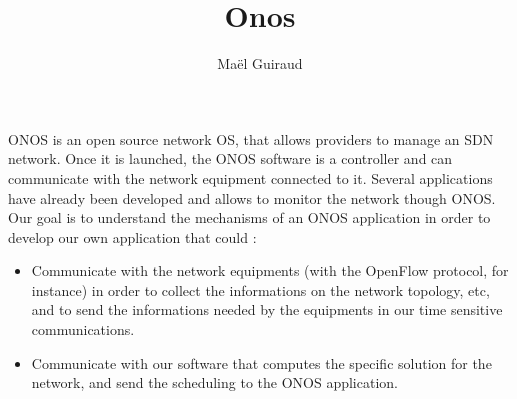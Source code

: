 \documentclass[10pt]{article}
\title{Onos}
\author[1,2]{Ma\"el Guiraud}
\affil[1]{David Laboratory, UVSQ}
\affil[2]{Nokia Bell Labs France}
\begin{document}
\maketitle

ONOS is an open source network OS, that allows providers to manage an SDN network. Once it is launched, the ONOS software is a controller and can communicate with the network equipment connected to it. Several applications have already been developed and allows to monitor the network though ONOS. Our goal is to understand the mechanisms of an ONOS application in order to develop our own application that could :
\begin{itemize}
\item Communicate with the network equipments (with the OpenFlow protocol, for instance) in order to collect the informations on the network  topology, etc, and to send the informations needed by the equipments in our time sensitive communications.

\item Communicate with our software that computes the specific solution for the network, and send the scheduling to the ONOS application.
\end{itemize}
\end{document}
